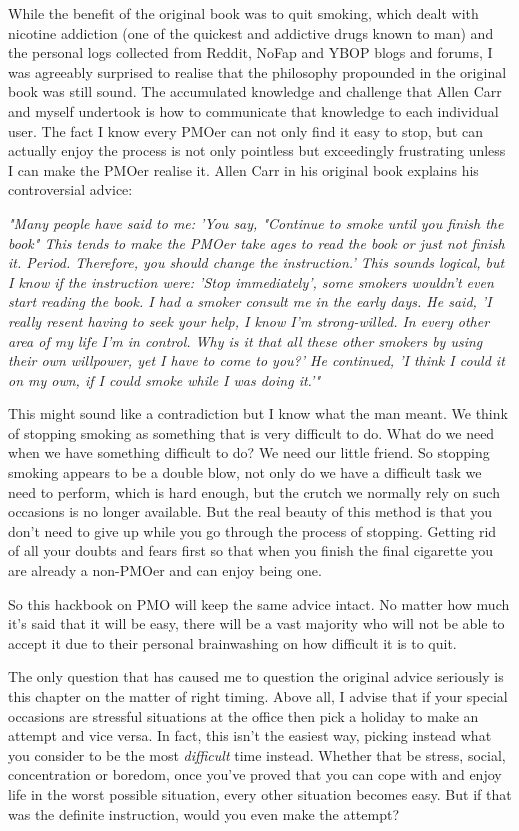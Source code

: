 \documentclass[easypeasy.tex]{subfiles}
\begin{document}
While the benefit of the original book was to quit smoking, which dealt with nicotine addiction (one of the quickest and addictive drugs known to man) and the personal logs collected from Reddit, NoFap and YBOP blogs and forums, I was agreeably surprised to realise that the philosophy propounded in the original book was still sound. The accumulated knowledge and challenge that Allen Carr and myself undertook is how to communicate that knowledge to each individual user. The fact I know every PMOer can not only find it easy to stop, but can actually enjoy the process is not only pointless but exceedingly frustrating unless I can make the PMOer realise it. Allen Carr in his original book explains his controversial advice:

  \textit{"Many people have said to me: 'You say, "Continue to smoke until you finish the book" This tends to make the PMOer take ages to read the book or just not finish it. Period. Therefore, you should change the instruction.' This sounds logical, but I know if the instruction were: 'Stop immediately', some smokers wouldn't even start reading the book. I had a smoker consult me in the early days. He said, 'I really resent having to seek your help, I know I'm strong-willed. In every other area of my life I'm in control. Why is it that all these other smokers by using their own willpower, yet I have to come to you?' He continued, 'I think I could it on my own, if I could smoke while I was doing it.'"}

This might sound like a contradiction but I know what the man meant. We think of stopping smoking as something that is very difficult to do. What do we need when we have something difficult to do? We need our little friend. So stopping smoking appears to be a double blow, not only do we have a difficult task we need to perform, which is hard enough, but the crutch we normally rely on such occasions is no longer available. But the real beauty of this method is that you don't need to give up while you go through the process of stopping. Getting rid of all your doubts and fears first so that when you finish the final cigarette you are already a non-PMOer and can enjoy being one.

So this hackbook on PMO will keep the same advice intact. No matter how much it's said that it will be easy, there will be a vast majority who will not be able to accept it due to their personal brainwashing on how difficult it is to quit.

The only question that has caused me to question the original advice seriously is this chapter on the matter of right timing. Above all, I advise that if your special occasions are stressful situations at the office then pick a holiday to make an attempt and vice versa. In fact, this isn't the easiest way, picking instead what you consider to be the most \textit{difficult} time instead. Whether that be stress, social, concentration or boredom, once you've proved that you can cope with and enjoy life in the worst possible situation, every other situation becomes easy. But if that was the definite instruction, would you even make the attempt?
\end{document}
